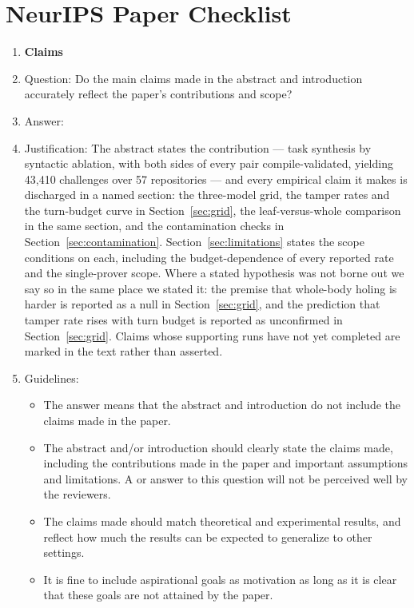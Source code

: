 \section*{NeurIPS Paper Checklist}

\begin{enumerate}

\item {\bf Claims}
    \item[] Question: Do the main claims made in the abstract and introduction accurately reflect the paper's contributions and scope?
    \item[] Answer: \answerYes{}
    \item[] Justification: The abstract states the contribution --- task synthesis by syntactic ablation, with both sides of every pair compile-validated, yielding 43{,}410 challenges over 57 repositories --- and every empirical claim it makes is discharged in a named section: the three-model grid, the tamper rates and the turn-budget curve in Section~\ref{sec:grid}, the leaf-versus-whole comparison in the same section, and the contamination checks in Section~\ref{sec:contamination}. Section~\ref{sec:limitations} states the scope conditions on each, including the budget-dependence of every reported rate and the single-prover scope. Where a stated hypothesis was not borne out we say so in the same place we stated it: the premise that whole-body holing is harder is reported as a null in Section~\ref{sec:grid}, and the prediction that tamper rate rises with turn budget is reported as unconfirmed in Section~\ref{sec:grid}. Claims whose supporting runs have not yet completed are marked in the text rather than asserted.
    \item[] Guidelines:
    \begin{itemize}
        \item The answer \answerNA{} means that the abstract and introduction do not include the claims made in the paper.
        \item The abstract and/or introduction should clearly state the claims made, including the contributions made in the paper and important assumptions and limitations. A \answerNo{} or \answerNA{} answer to this question will not be perceived well by the reviewers. 
        \item The claims made should match theoretical and experimental results, and reflect how much the results can be expected to generalize to other settings. 
        \item It is fine to include aspirational goals as motivation as long as it is clear that these goals are not attained by the paper. 
    \end{itemize}


\end{enumerate}
